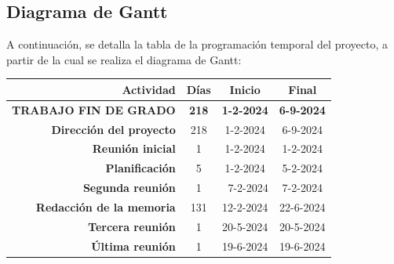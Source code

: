   \subsection{Diagrama de Gantt}

  A continuación, se detalla la tabla de la programación temporal del proyecto, a partir de la cual se realiza el diagrama de Gantt:

  \begin{table}[!h]
    \centering
    \begin{tabular}{|r|c|c|c|}
    \hline
    \rowcolor[HTML]{CBCEFB} 
    \textbf{Actividad}                                           & \textbf{Días}             & \textbf{Inicio}                   & \textbf{Final}                    \\ \hline
    \rowcolor[HTML]{FFCCC9} 
    \textbf{TRABAJO FIN DE GRADO}                                & \textbf{218}              & \textbf{1-2-2024}                 & \textbf{6-9-2024}                \\ \hline
    \rowcolor[HTML]{FFCE93} 
    \textbf{Dirección del proyecto}                              & 218                       & 1-2-2024                          & 6-9-2024                         \\ \hline
    \rowcolor[HTML]{CBE5CB} 
    \textbf{Reunión inicial}                                     & 1                         & 1-2-2024                          & \cellcolor[HTML]{CBE5CB}1-2-2024  \\ \hline
    \rowcolor[HTML]{CBE5CB} 
    \textbf{Planificación}                                       & 5                         & \cellcolor[HTML]{CBE5CB}1-2-2024  & \cellcolor[HTML]{CBE5CB}5-2-2024  \\ \hline
    \rowcolor[HTML]{CBE5CB} 
    \textbf{Segunda reunión} &
      \cellcolor[HTML]{CBE5CB}1 &
      \multicolumn{1}{r|}{\cellcolor[HTML]{CBE5CB}7-2-2024} &
      \cellcolor[HTML]{CBE5CB}7-2-2024 \\ \hline
    \rowcolor[HTML]{CBE5CB} 
    \cellcolor[HTML]{CBE5CB}\textbf{Redacción de la memoria}     & 131                       & 12-2-2024                         & 22-6-2024                         \\ \hline
    \rowcolor[HTML]{CBE5CB} 
    \textbf{Tercera reunión}                                     & 1                         & 20-5-2024                         & \cellcolor[HTML]{CBE5CB}20-5-2024 \\ \hline
    \rowcolor[HTML]{CBE5CB} 
    \textbf{Última reunión}                                      & 1                         & 19-6-2024                         & 19-6-2024                         \\ \hline

\end{tabular}
\end{table}
